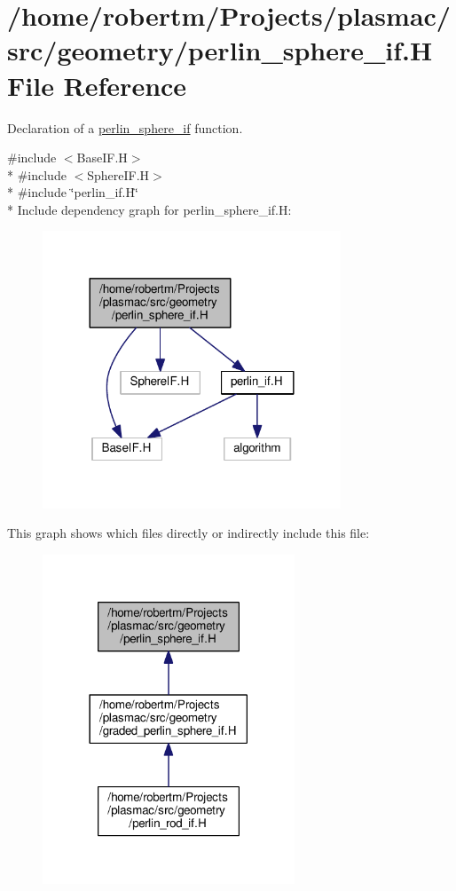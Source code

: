 \hypertarget{perlin__sphere__if_8H}{}\section{/home/robertm/\+Projects/plasmac/src/geometry/perlin\+\_\+sphere\+\_\+if.H File Reference}
\label{perlin__sphere__if_8H}


Declaration of a \hyperlink{classperlin__sphere__if}{perlin\+\_\+sphere\+\_\+if} function.  


{\ttfamily \#include $<$Base\+I\+F.\+H$>$}\\*
{\ttfamily \#include $<$Sphere\+I\+F.\+H$>$}\\*
{\ttfamily \#include \char`\"{}perlin\+\_\+if.\+H\char`\"{}}\\*
Include dependency graph for perlin\+\_\+sphere\+\_\+if.\+H\+:\nopagebreak
\begin{figure}[H]
\begin{center}
\leavevmode
\includegraphics[width=252pt]{perlin__sphere__if_8H__incl}
\end{center}
\end{figure}
This graph shows which files directly or indirectly include this file\+:\nopagebreak
\begin{figure}[H]
\begin{center}
\leavevmode
\includegraphics[width=213pt]{perlin__sphere__if_8H__dep__incl}
\end{center}
\end{figure}
